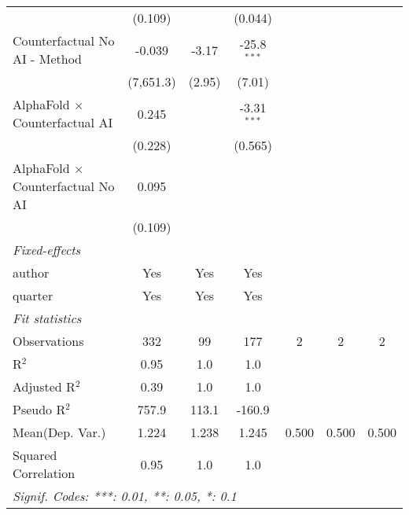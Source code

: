 \begin{tabular}{lcccccc}
                                            & (0.109)      &                & (0.044)        &     &     &   \\   
   Counterfactual No AI - Method            & -0.039       & -3.17          & -25.8$^{***}$  &     &     &   \\   
                                            & (7,651.3)    & (2.95)         & (7.01)         &     &     &   \\   
   AlphaFold $\times$ Counterfactual AI     & 0.245        &                & -3.31$^{***}$  &     &     &   \\   
                                            & (0.228)      &                & (0.565)        &     &     &   \\   
   AlphaFold $\times$ Counterfactual No AI  & 0.095        &                &                &     &     &   \\   
                                            & (0.109)      &                &                &     &     &   \\   
   \midrule
   \emph{Fixed-effects}\\
   author                                   & Yes          & Yes            & Yes            &     &     & \\  
   quarter                                  & Yes          & Yes            & Yes            &     &     & \\  
   \midrule
   \emph{Fit statistics}\\
   Observations                             & 332          & 99             & 177            & 2   & 2   & 2\\  
   R$^2$                                    & 0.95         & 1.0            & 1.0            &     &     & \\  
   Adjusted R$^2$                           & 0.39         & 1.0            & 1.0            &     &     & \\  
   Pseudo R$^2$                             & 757.9        & 113.1          & -160.9         &     &     & \\  
Mean(Dep. Var.) & 1.224 & 1.238 & 1.245 & 0.500 & 0.500 & 0.500 \\
   Squared Correlation                      & 0.95         & 1.0            & 1.0            &     &     & \\  
   \midrule \midrule
   \multicolumn{7}{l}{\emph{Signif. Codes: ***: 0.01, **: 0.05, *: 0.1}}\\
\end{tabular}
\par\endgroup
